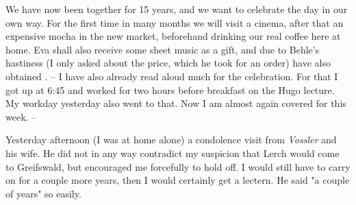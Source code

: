 
We have now been together for 15 years, and we want to celebrate the day in our own way. For the first time in many months we will visit a cinema, after that an expensive mocha in the new market, beforehand drinking our real coffee here at home. Eva shall also receive some sheet music as a gift, and due to Behle's hastiness (I only asked about the price, which he took for an order) have also obtained . -- I have also already read aloud much for the celebration. For that I got up at 6:45 and worked for two hours before breakfast on the Hugo lecture. My workday yesterday also went to that. Now I am almost again covered for this week. --

\missing

Yesterday afternoon (I was at home alone) a condolence visit from \textit{Vossler} and his wife. He did not in any way contradict my suspicion that Lerch would come to Greifswald, but encouraged me forcefully to hold off. I would still have to carry on for a couple more years, then I would certainly get a lectern. He said "a couple of years" so easily.

\missing
%